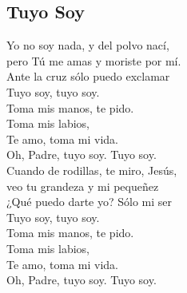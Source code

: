 \subsection{Tuyo Soy}

\begin{center}

{\Large
Yo no soy nada, y del polvo nací,\\
pero Tú me amas y moriste por mí.\\
Ante la cruz sólo puedo exclamar\\
Tuyo soy, tuyo soy.\\
\vspace{2em}
Toma mis manos, te pido.\\
Toma mis labios,\\
Te amo, toma mi vida.\\
Oh, Padre, tuyo soy. Tuyo soy.\\
\vspace{2em}
Cuando de rodillas, te miro, Jesús,\\
veo tu grandeza y mi pequeñez\\
¿Qué puedo darte yo? Sólo mi ser\\
Tuyo soy, tuyo soy.\\
\vspace{2em}
Toma mis manos, te pido.\\
Toma mis labios,\\
Te amo, toma mi vida.\\
Oh, Padre, tuyo soy. Tuyo soy.\\
}
\end{center}
